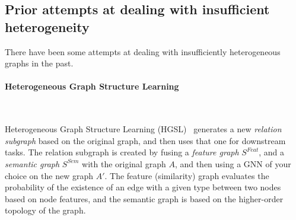 % 
% 


\subsection{Prior attempts at dealing with insufficient heterogeneity}
% 
% 


There have been some attempts at dealing with insufficiently heterogeneous graphs in the past.

\paragraph{Heterogeneous Graph Structure Learning}$\,$

Heterogeneous Graph Structure Learning (HGSL)~\cite{zhao_heterogeneous_2021} generates a new \emph{relation subgraph} based on the original graph, and then uses that one for downstream tasks.
The relation subgraph is created by fusing a \emph{feature graph} $S^{Feat}$, and a \emph{semantic graph} $S^{Sem}$
with the original graph $A$, and then using a GNN of your choice on the new graph $A'$.
The feature (similarity) graph evaluates the probability of the existence of an edge with a given type between two
nodes based on node features, and the semantic graph is based on the higher-order topology of the graph.

